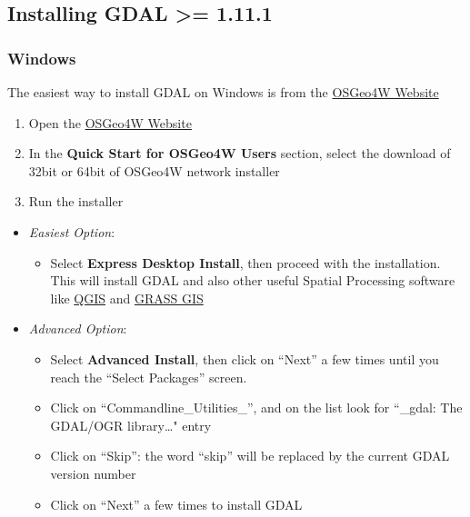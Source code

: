 \documentclass[]{article}
\providecommand{\tightlist}{%
  \setlength{\itemsep}{0pt}\setlength{\parskip}{0pt}}
\begin{document}
\subsection{Installing GDAL \textgreater{}=
1.11.1}\label{installing-gdal-1.11.1}

\subsubsection{Windows}\label{windows-1}

The easiest way to install GDAL on Windows is from the
\href{https://trac.osgeo.org/osgeo4w/}{OSGeo4W Website}

\begin{enumerate}
\def\labelenumi{\arabic{enumi}.}
\tightlist
\item
  Open the \href{https://trac.osgeo.org/osgeo4w/}{OSGeo4W Website}
\item
  In the \textbf{Quick Start for OSGeo4W Users} section, select the
  download of 32bit or 64bit of OSGeo4W network installer
\item
  Run the installer
\end{enumerate}

\begin{itemize}
\tightlist
\item
  \emph{Easiest Option}:

  \begin{itemize}
  \tightlist
  \item
    Select \textbf{Express Desktop Install}, then proceed with the
    installation. This will install GDAL and also other useful Spatial
    Processing software like \href{http://www.qgis.org/}{QGIS} and
    \href{https://grass.osgeo.org/}{GRASS GIS}
  \end{itemize}
\item
  \emph{Advanced Option}:

  \begin{itemize}
  \tightlist
  \item
    Select \textbf{Advanced Install}, then click on ``Next'' a few times
    until you reach the ``Select Packages'' screen.
  \item
    Click on ``Commandline\_Utilities\_'', and on the list look for
    ``\_gdal: The GDAL/OGR library\ldots{}" entry
  \item
    Click on ``Skip'': the word ``skip'' will be replaced by the current
    GDAL version number
  \item
    Click on ``Next'' a few times to install GDAL
  \end{itemize}
\end{itemize}
\end{document}
